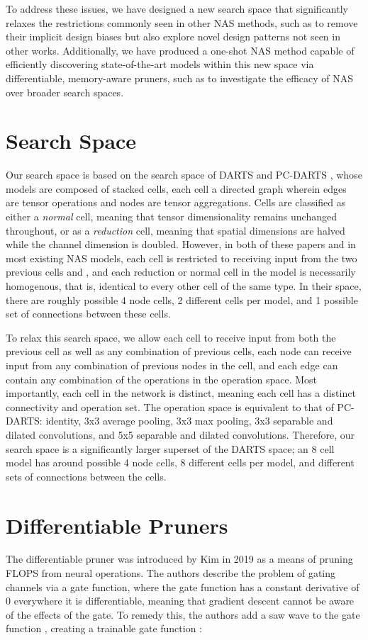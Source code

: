 \documentclass[10pt,twocolumn,letterpaper]{article}
\begin{document}
To address these issues, we have designed a new search space that significantly relaxes the restrictions commonly seen in other NAS methods, such as to remove their implicit design biases but also explore novel design patterns not seen in other works.  Additionally, we have produced a one-shot NAS method capable of efficiently discovering state-of-the-art models within this new space via differentiable, memory-aware pruners, such as to investigate the efficacy of NAS over broader search spaces. 
 
\section{Search Space}
Our search space is based on the search space of DARTS \cite{liu2019} and PC-DARTS \cite{xu2020}, whose models are composed of stacked cells, each cell a directed graph wherein edges are tensor operations and nodes are tensor aggregations. Cells are classified as either a \textit{normal} cell, meaning that tensor dimensionality remains unchanged throughout, or as a \textit{reduction} cell, meaning that spatial dimensions are halved while the channel dimension is doubled. However, in both of these papers and in most existing NAS models, each cell  is restricted to receiving input from the two previous cells  and , and each reduction or normal cell in the model is necessarily homogenous, that is, identical to every other cell of the same type. In their space, there are roughly  possible 4 node cells, 2 different cells per model, and 1 possible set of connections between these cells.

To relax this search space, we allow each cell to receive input from both the previous cell as well as any combination of previous cells, each node can receive input from any combination of previous nodes in the cell, and each edge can contain any combination of the operations in the operation space. Most importantly, each cell in the network is distinct, meaning each cell has a distinct connectivity and operation set. The operation space is equivalent to that of PC-DARTS: identity, 3x3 average pooling, 3x3 max pooling, 3x3 separable and dilated convolutions, and 5x5 separable and dilated convolutions. Therefore, our search space is a significantly larger superset of the DARTS space; an 8 cell model has around  possible 4 node cells, 8 different cells per model, and  different sets of connections between the cells.

\section{Differentiable Pruners}
The differentiable pruner was introduced by Kim \etal \cite{kim2019} in 2019 as a means of pruning FLOPS from neural operations. The authors describe the problem of gating channels via a gate function, where the gate function has a constant derivative of 0 everywhere it is differentiable, meaning that gradient descent cannot be aware of the effects of the gate. To remedy this, the authors add a saw wave  to the gate function , creating a trainable gate function :
\end{document}
